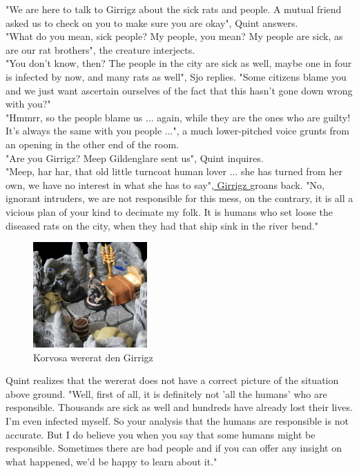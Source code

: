 "We are here to talk to Girrigz about the sick rats and people. A mutual friend asked us to check on you to make sure you are okay", Quint answers.\\

"What do you mean, sick people? My people, you mean? My people are sick, as are our rat brothers", the creature interjects.\\

"You don't know, then? The people in the city are sick as well, maybe one in four is infected by now, and many rats as well", Sjo replies. "Some citizens blame you and we just want ascertain ourselves of the fact that this hasn't gone down wrong with you?"\\

"Hmmrr, so the people blame us ... again, while they are the ones who are guilty! It's always the same with you people ...", a much lower-pitched voice grunts from an opening in the other end of the room.\\

"Are you Girrigz? Meep Gildenglare sent us", Quint inquires.\\

"Meep, har har, that old little turncoat human lover ... she has turned from her own, we have no interest in what she has to say",\hyperref[fig:Korvosa-wererat-den-Girrigz-503384054]{ Girrigz } groans back. "No, ignorant intruders, we are not responsible for this mess, on the contrary, it is all a vicious plan of your kind to decimate my folk. It is humans who set loose the diseased rats on the city, when they had that ship sink in the river bend." \\

\begin{figure}[h]
	\centering
	\includegraphics[width=0.39\textwidth]{images/Korvosa-wererat-den-Girrigz-503384054.jpg}
	\caption{Korvosa wererat den Girrigz}
	\label{fig:Korvosa-wererat-den-Girrigz-503384054}
\end{figure}

Quint realizes that the wererat does not have a correct picture of the situation above ground. "Well, first of all, it is definitely not 'all the humans' who are responsible. Thousands are sick as well and hundreds have already lost their lives. I'm even infected myself. So your analysis that the humans are responsible is not accurate. But I do believe you when you say that some humans might be responsible. Sometimes there are bad people and if you can offer any insight on what happened, we'd be happy to learn about it."\\

